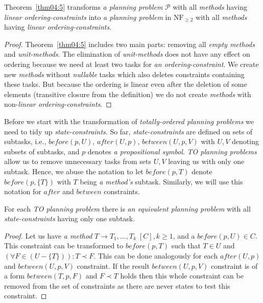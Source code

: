\begin{thm}\label{thm04:7}
    Theorem~\ref{thm04:5} transforms \emph{a planning problem} $\mathcal{P}$ with all \emph{methods} having \emph{linear ordering-constraints} into \emph{a planning problem} in $\text{NF}_{\geq 2}$ with all \emph{methods} having \emph{linear ordering-constraints}.
\end{thm}
\begin{proof}
    Theorem~\ref{thm04:5} includes two main parts: removing all \emph{empty methods} and \emph{unit-methods}. The elimination of \emph{unit-methods} does not have any effect on ordering because we need at least two tasks for \emph{an ordering-constraint}. We create new \emph{methods} without \emph{nullable} tasks which also deletes constraints containing these tasks. But because the ordering is linear even after the deletion of some elements (transitive closure from the definition) we do not create \emph{methods} with non-\emph{linear ordering-constraints}.
\end{proof}

\medskip\noindent
Before we start with the transformation of \emph{totally-ordered planning problems} we need to tidy up \emph{state-constraints}. So far, \emph{state-constraints} are defined on sets of subtasks, i.e., $before(p, U)$, $after(U, p)$, $between(U, p, V)$ with $U, V$ denoting subsets of subtasks, and $p$ denotes \emph{a propositional symbol}. \emph{TO planning problems} allow us to remove unnecessary tasks from sets $U, V$ leaving us with only one subtask. Hence, we abuse the notation to let $before(p, T)$ denote $before(p, \{ T \})$ with $T$ being \emph{a method's} subtask. Similarly, we will use this notation for $after$ and $between$ constraints. 

\begin{thm}\label{thm04:8}
    For each \emph{TO planning problem} there is \emph{an equivalent planning problem} with all \emph{state-constraints} having only one subtask.
\end{thm}
\begin{proof}
    Let us have \emph{a method} $T \rightarrow T_1, \dots, T_k \; [C], k \geq 1$, and a $before(p, U) \in C$. This constraint can be transformed to $before(p, T)$ such that $T \in U$ and $(\forall F \in (U - \{ T \})): T \prec F$. This can be done analogously for each $after(U, p)$ and $between(U, p, V)$ constraint. If the result $between(U, p, V)$ constraint is of a form $between(T, p, F)$ and $F \prec T$ holds then this whole constraint can be removed from the set of constraints as there are never states to test this constraint. 
\end{proof}

